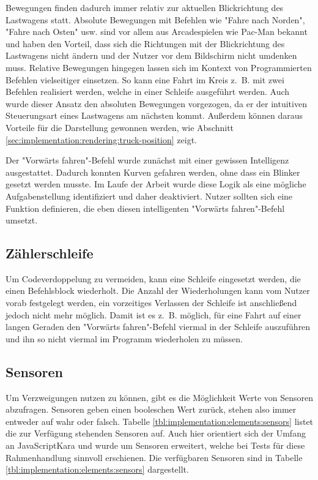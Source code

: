 Bewegungen finden dadurch immer relativ zur aktuellen Blickrichtung des Lastwagens statt. Absolute Bewegungen mit Befehlen wie "Fahre nach Norden", "Fahre nach Osten" usw. sind vor allem aus Arcadespielen wie Pac-Man bekannt und haben den Vorteil, dass sich die Richtungen mit der Blickrichtung des Lastwagens nicht ändern und der Nutzer vor dem Bildschirm nicht umdenken muss. Relative Bewegungen hingegen lassen sich im Kontext von Programmierten Befehlen vielseitiger einsetzen. So kann eine Fahrt im Kreis z.~B. mit zwei Befehlen realisiert werden, welche in einer Schleife ausgeführt werden. Auch wurde dieser Ansatz den absoluten Bewegungen vorgezogen, da er der intuitiven Steuerungsart eines Lastwagens am nächsten kommt. Außerdem können daraus Vorteile für die Darstellung gewonnen werden, wie Abschnitt \ref{sec:implementation:rendering:truck-position} zeigt.

Der "Vorwärts fahren"-Be\-fehl wurde zunächst mit einer gewissen Intelligenz ausgestattet. Dadurch konnten Kurven gefahren werden, ohne dass ein Blinker gesetzt werden musste. Im Laufe der Arbeit wurde diese Logik als eine mögliche Aufgabenstellung identifiziert und daher deaktiviert. Nutzer sollten sich eine Funktion definieren, die eben diesen intelligenten "Vorwärts fahren"-Be\-fehl umsetzt.

\subsection*{Zählerschleife}
\label{sec:implementation:elements:for}

Um Codeverdoppelung zu vermeiden, kann eine Schleife eingesetzt werden, die einen Befehlsblock wiederholt. Die Anzahl der Wiederholungen kann vom Nutzer vorab festgelegt werden, ein vorzeitiges Verlassen der Schleife ist anschließend jedoch nicht mehr möglich. Damit ist es z.~B. möglich, für eine Fahrt auf einer langen Geraden den "Vorwärts fahren"-Be\-fehl viermal in der Schleife auszuführen und ihn so nicht viermal im Programm wiederholen zu müssen.

\subsection*{Sensoren}
\label{sec:implementation:elements:sensors}

Um Verzweigungen nutzen zu können, gibt es die Möglichkeit Werte von Sensoren abzufragen. Sensoren geben einen booleschen Wert zurück, stehen also immer entweder auf wahr oder falsch. Tabelle \ref{tbl:implementation:elements:sensors} listet die zur Verfügung stehenden Sensoren auf. Auch hier orientiert sich der Umfang an JavaScriptKara und wurde um Sensoren erweitert, welche bei Tests für diese Rahmenhandlung sinnvoll erschienen. Die verfügbaren Sensoren sind in Tabelle \ref{tbl:implementation:elements:sensors} dargestellt.

